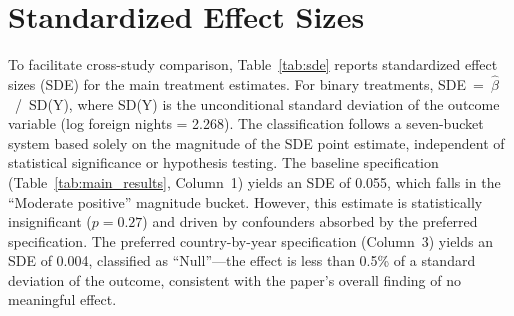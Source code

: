 \documentclass[12pt]{article}
\begin{document}
\section{Standardized Effect Sizes}
\label{sec:sde}

To facilitate cross-study comparison, Table~\ref{tab:sde} reports standardized effect sizes (SDE) for the main treatment estimates. For binary treatments, SDE~=~$\hat{\beta}$~/~SD(Y), where SD(Y) is the unconditional standard deviation of the outcome variable (log foreign nights = 2.268). The classification follows a seven-bucket system based solely on the magnitude of the SDE point estimate, independent of statistical significance or hypothesis testing. The baseline specification (Table~\ref{tab:main_results}, Column~1) yields an SDE of 0.055, which falls in the ``Moderate positive'' magnitude bucket. However, this estimate is statistically insignificant ($p = 0.27$) and driven by confounders absorbed by the preferred specification. The preferred country-by-year specification (Column~3) yields an SDE of 0.004, classified as ``Null''---the effect is less than 0.5\% of a standard deviation of the outcome, consistent with the paper's overall finding of no meaningful effect.


\end{document}
